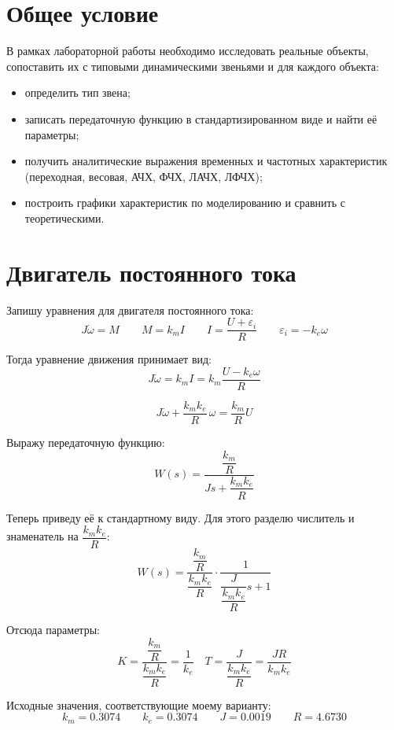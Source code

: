 \documentclass[a4paper,12pt]{article}
\begin{document}
	\newpage
	\tableofcontents
	
	\newpage
	\section{Общее условие}
	
	В рамках лабораторной работы необходимо исследовать реальные объекты,
	сопоставить их с типовыми динамическими звеньями и для каждого объекта:
	
	\begin{itemize}
		\item определить тип звена;
		\item записать передаточную функцию в стандартизированном виде и найти её параметры;
		\item получить аналитические выражения временных и частотных характеристик
		(переходная, весовая, АЧХ, ФЧХ, ЛАЧХ, ЛФЧХ);
		\item построить графики характеристик по моделированию и сравнить с теоретическими.
	\end{itemize}
	
	
	
	\newpage
	\section{Двигатель постоянного тока}
	
	
	
	Запишу уравнения для двигателя постоянного тока:
	\[
	J\dot{\omega} = M \qquad
	M = k_m I \qquad
	I = \frac{U + \varepsilon_i}{R} \qquad
	\varepsilon_i = -k_e \omega
	\]
	
	Тогда уравнение движения принимает вид:
	\[
	J\dot{\omega} = k_m I = k_m\frac{U - k_e \omega}{R}
	\]
	
	\[
	J\dot{\omega} + \frac{k_m k_e}{R}\,\omega = \frac{k_m}{R}U
	\]
	
	Выражу передаточную функцию:
	\[
	W(s)=
	\frac{\dfrac{k_m}{R}}{Js + \dfrac{k_m k_e}{R}}
	\]
	
	Теперь приведу её к стандартному виду. Для этого разделю числитель и знаменатель на \(\dfrac{k_m k_e}{R}\):
	\[
	W(s)=
	\frac{\dfrac{k_m}{R}}{\dfrac{k_m k_e}{R}}
	\cdot
	\frac{1}{\dfrac{J}{\dfrac{k_m k_e}{R}}s + 1}
	\]
	
	Отсюда параметры:
	\[
	K =
	\frac{\dfrac{k_m}{R}}{\dfrac{k_m k_e}{R}}
	= \frac{1}{k_e}
	\quad 
	T =
	\frac{J}{\dfrac{k_m k_e}{R}}
	= \frac{JR}{k_m k_e}
	\]
	
	Исходные значения, соответствующие моему варианту:
	\[
	k_m = 0.3074 \qquad
	k_e = 0.3074 \qquad
	J = 0.0019 \qquad
	R = 4.6730
	\]
	
\end{document}
